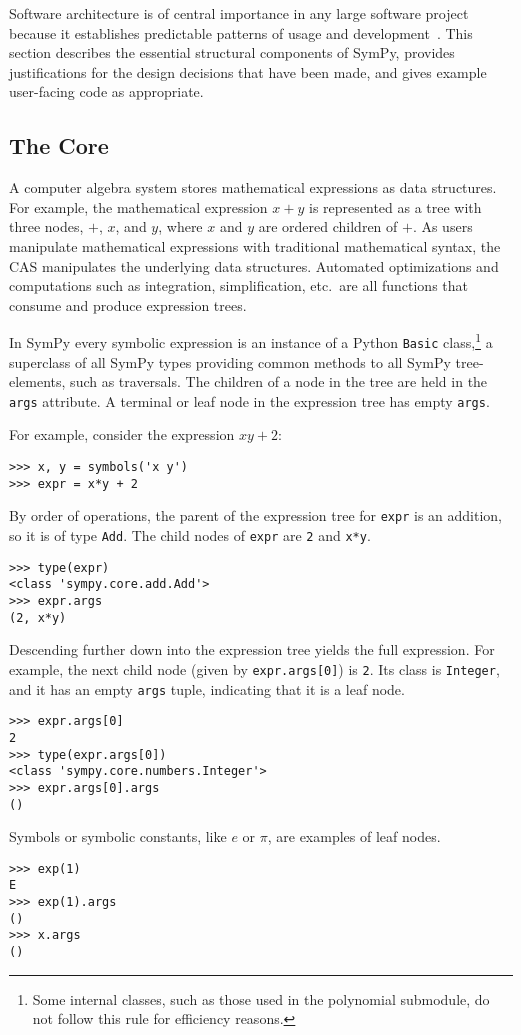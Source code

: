 Software architecture is of central importance in any large software
project because it establishes predictable patterns of usage and
development~\cite{Shaw1996}. This section describes the essential
structural components of SymPy, provides justifications for the design
decisions that have been made, and gives example
user-facing code as appropriate.

\subsection{The Core}
\label{sec:core}
A computer algebra system stores mathematical expressions as data
structures.  For example, the mathematical expression $x + y$ is represented as
a tree with three nodes, $+$, $x$, and $y$, where $x$ and $y$ are ordered
children of $+$.  As users manipulate
mathematical expressions with traditional mathematical syntax, the CAS
manipulates the underlying data structures.  Automated optimizations and
computations such as integration, simplification, etc.\ are all functions that
consume and produce expression trees.

In SymPy every symbolic expression is an instance of a Python \texttt{Basic}
class,\footnote{Some
  internal classes, such as those used in the polynomial submodule, do not follow
  this rule for efficiency reasons.} a superclass of all SymPy types providing
common methods to all SymPy tree-elements, such as traversals.  The children of a node in the
tree are held in the \texttt{args} attribute.  A terminal or leaf node in the
expression tree has empty \texttt{args}.

For example, consider the expression $xy + 2$:
\begin{verbatim}
>>> x, y = symbols('x y')
>>> expr = x*y + 2
\end{verbatim}
By order of operations, the parent of the expression tree for \texttt{expr} is
an addition, so it is of type \texttt{Add}. The child nodes of \texttt{expr} are
\texttt{2} and \texttt{x*y}.
\begin{verbatim}
>>> type(expr)
<class 'sympy.core.add.Add'>
>>> expr.args
(2, x*y)
\end{verbatim}

Descending further down into the expression tree yields the full expression. For
example, the next child node (given by \texttt{expr.args[0]}) is
\texttt{2}. Its class is \texttt{Integer}, and it has an empty \texttt{args}
tuple, indicating that it is a leaf node.
\begin{verbatim}
>>> expr.args[0]
2
>>> type(expr.args[0])
<class 'sympy.core.numbers.Integer'>
>>> expr.args[0].args
()
\end{verbatim}
Symbols or symbolic constants, like $e$ or $\pi$, are examples of
leaf nodes.
\begin{verbatim}
>>> exp(1)
E
>>> exp(1).args
()
>>> x.args
()
\end{verbatim}

